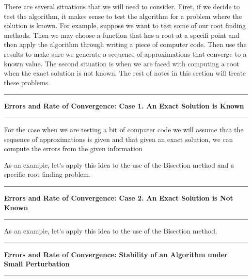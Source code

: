\documentclass[10pt,fleqn]{article}
\begin{document}
There are several situations that we will need to consider. Firet, if we decide
to test the algorithm, it makes sense to test the algorithm for a problem where
the solution is known. For example, suppose we want to test some of our root
finding methods. Then we may choose a function that has a root at a specifi
point and then apply the algorithm through writing a piece of computer code.
Then use the results to make sure we generate a sequence of approximations that
converge to a known value. The second situation is when we are faced with
computing a root when the exact solution is not known. The rest of notes in
this section will treate these problems.
\vskip0.1in\hrule\vskip0.1in
\noindent
{\bf Errors and Rate of Convergence: Case 1. An Exact Solution is Known}
\vskip0.1in\hrule\vskip0.1in
\noindent
For the case when we are testing a bit of computer code we will assume that the
sequence of approximations is given and that given an exact solution, we can
compute the errors from the given information

As an example, let's apply this idea to the use of the Bisection method and a
specific root finding problem.






\vskip0.1in\hrule\vskip0.1in
\noindent
{\bf Errors and Rate of Convergence: Case 2. An Exact Solution is Not Known}
\vskip0.1in\hrule\vskip0.1in

As an example, let's apply this idea to the use of the Bisection method.






\vskip0.1in\hrule\vskip0.1in
\noindent
{\bf Errors and Rate of Convergence: Stability of an Algorithm under Small
Perturbation }
\vskip0.1in\hrule\vskip0.1in









\end{document}

